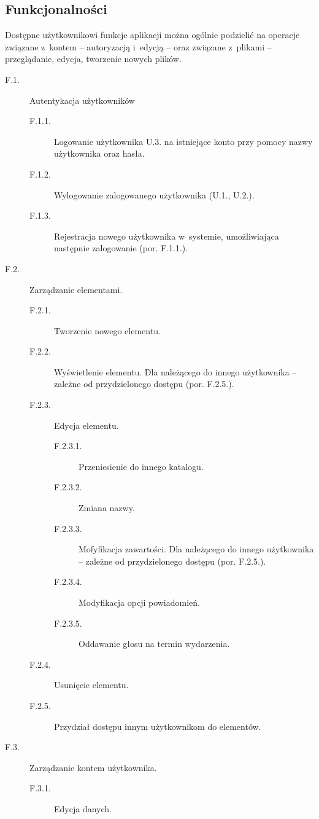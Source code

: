 \documentclass[a4paper,twoside,12pt]{book}
\begin{document}
\subsection{Funkcjonalności}
Dostępne użytkownikowi funkcje aplikacji można ogólnie podzielić na operacje związane z~kontem -- autoryzacją i~edycją -- oraz związane z~plikami -- przeglądanie, edycja, tworzenie nowych plików.
\begin{description}
	\item [F.1.] Autentykacja użytkowników
	\begin{description}
		\item [F.1.1.] Logowanie użytkownika U.3. na istniejące konto przy pomocy nazwy użytkownika oraz hasła.
		\item [F.1.2.] Wylogowanie zalogowanego użytkownika (U.1., U.2.).
		\item [F.1.3.] Rejestracja nowego użytkownika w~systemie, umożliwiająca następnie zalogowanie (por. F.1.1.).
	\end{description}
	\item [F.2.] Zarządzanie elementami.
	\begin{description}
		\item [F.2.1.] Tworzenie nowego elementu.
		\item [F.2.2.] Wyświetlenie elementu. Dla należącego do innego użytkownika -- zależne od przydzielonego dostępu (por. F.2.5.).
		\item [F.2.3.] Edycja elementu.
		\begin{description}
			\item [F.2.3.1.] Przeniesienie do innego katalogu.
			\item [F.2.3.2.] Zmiana nazwy.
			\item [F.2.3.3.] Mofyfikacja zawartości. Dla należącego do innego użytkownika -- zależne od przydzielonego dostępu (por. F.2.5.).
			\item [F.2.3.4.] Modyfikacja opcji powiadomień.
			\item [F.2.3.5.] Oddawanie głosu na termin wydarzenia.
		\end{description}
		\item [F.2.4.] Usunięcie elementu.
		\item [F.2.5.] Przydział dostępu innym użytkownikom do elementów.
	\end{description}
	\item [F.3.] Zarządzanie kontem użytkownika.
	\begin{description}
		\item [F.3.1.] Edycja danych.

\end{description}
\end{description}
\end{document}
